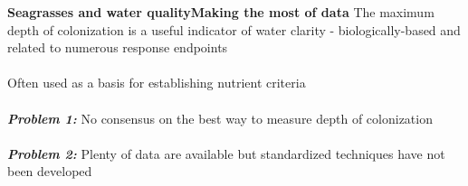 \documentclass[serif]{beamer}\usepackage[]{graphicx}\usepackage[]{color}
\newcommand{\emtxt}[1]{\textbf{\textit{#1}}}
\begin{document}
\begin{frame}{\textbf{Seagrasses and water quality}}{\textbf{Making the most of data}}
\onslide<+->
The maximum depth of colonization is a useful indicator of water clarity - biologically-based and related to numerous response endpoints \\~\\
Often used as a basis for establishing nutrient criteria \\~\\
\onslide<+->
\emtxt{Problem 1:} No consensus on the best way to measure depth of colonization\\~\\
\emtxt{Problem 2:} Plenty of data are available but standardized techniques have not been developed
\end{frame}
\end{document}
